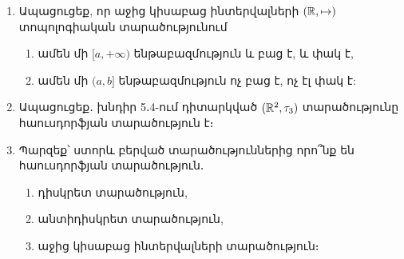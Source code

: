 \begin{enumerate}[label=\thesection.\arabic*.]
\item Ապացուցեք, որ աջից կիսաբաց ինտերվալների $(\mathbb{R}, \mapsto)$ տոպոլոգիական  \linebreak տարա\-ծու\-թյունում
\begin{enumerate}
    \item[ա)] ամեն մի $[a, +\infty)$ ենթաբազմություն և բաց է, և փակ է,
    
    \item[բ)] ամեն մի $(a, b]$ ենթաբազմություն ոչ բաց է, ոչ էլ փակ է:
\end{enumerate}


\item Ապացուցեք․ խնդիր 5․4-ում դիտարկված $(\mathbb{R}^2, \tau_3)$ տարածությունը հաուս\-դորֆ\-յան տարածություն է։

\newpage

\item Պարզեք՝ ստորև բերված տարածություններից որո՞նք են հաուսդորֆյան  \linebreak տարա\-ծու\-թյուն․
\begin{enumerate}
    \item[ա)] դիսկրետ տարածություն,
    \item[բ)] անտիդիսկրետ տարածություն,
    \item[գ)] աջից կիսաբաց ինտերվալների տարածություն։
\end{enumerate}

\end{enumerate}
